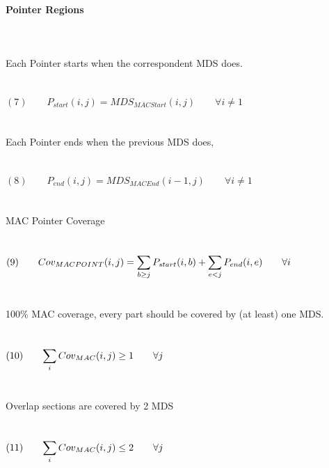\paragraph{Pointer Regions} $ $
\\\\\\
Each Pointer starts when the correspondent MDS does. \\\\\\
$(7) \qquad P_{start}(i,j) = MDS_{MACStart}(i,j) \qquad \forall i \neq 1$ \\\\\\
Each Pointer ends when the previous MDS does, \\\\\\
$(8) \qquad P_{end}(i,j) = MDS_{MACEnd}(i-1,j) \qquad \forall i \neq 1$ \\\\\\
MAC Pointer Coverage \\\\\\
$(9) \qquad Cov_{MACPOINT}(i,j) = \mathlarger{\sum_{b \geq j} P_{start}(i,b) + \sum_{e < j} P_{end}(i,e) \qquad \forall i}$ \\\\\\
100\% MAC coverage, every part should be covered by (at least) one MDS. \\\\\\
$(10) \qquad \mathlarger{\sum_{i} Cov_{MAC}(i,j) \geq 1 \qquad \forall j }$ \\\\\\
Overlap sections are covered by 2 MDS \\\\\\
$(11) \qquad \mathlarger{\sum_{i} Cov_{MAC}(i,j) \leq 2 \qquad \forall j }$ \\\\\\

